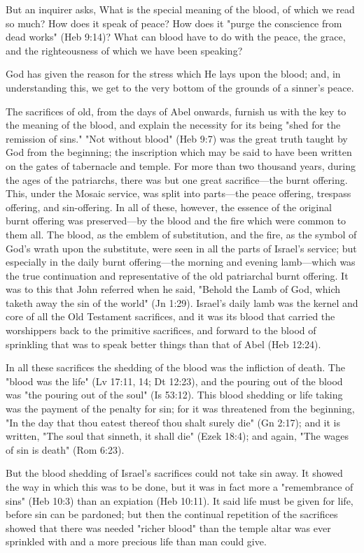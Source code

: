 \documentclass[
]{book}
\begin{document}
But an inquirer asks, What is the special meaning of the blood, of which we read so much? How does it speak of peace? How does it "purge the conscience from dead works" (Heb 9:14)? What can blood have to do with the peace, the grace, and the righteousness of which we have been speaking?

God has given the reason for the stress which He lays upon the blood; and, in understanding this, we get to the very bottom of the grounds of a sinner's peace.

The sacrifices of old, from the days of Abel onwards, furnish us with the key to the meaning of the blood, and explain the necessity for its being "shed for the remission of sins." "Not without blood" (Heb 9:7) was the great truth taught by God from the beginning; the inscription which may be said to have been written on the gates of tabernacle and temple. For more than two thousand years, during the ages of the patriarchs, there was but one great sacrifice---the burnt offering. This, under the Mosaic service, was split into parts---the peace offering, trespass offering, and sin-offering. In all of these, however, the essence of the original burnt offering was preserved---by the blood and the fire which were common to them all. The blood, as the emblem of substitution, and the fire, as the symbol of God's wrath upon the substitute, were seen in all the parts of Israel's service; but especially in the daily burnt offering---the morning and evening lamb---which was the true continuation and representative of the old patriarchal burnt offering. It was to this that John referred when he said, "Behold the Lamb of God, which taketh away the sin of the world" (Jn 1:29). Israel's daily lamb was the kernel and core of all the Old Testament sacrifices, and it was its blood that carried the worshippers back to the primitive sacrifices, and forward to the blood of sprinkling that was to speak better things than that of Abel (Heb 12:24).

In all these sacrifices the shedding of the blood was the infliction of death. The "blood was the life" (Lv 17:11, 14; Dt 12:23), and the pouring out of the blood was "the pouring out of the soul" (Is 53:12). This blood shedding or life taking was the payment of the penalty for sin; for it was threatened from the beginning, "In the day that thou eatest thereof thou shalt surely die" (Gn 2:17); and it is written, "The soul that sinneth, it shall die" (Ezek 18:4); and again, "The wages of sin is death" (Rom 6:23).

But the blood shedding of Israel's sacrifices could not take sin away. It showed the way in which this was to be done, but it was in fact more a "remembrance of sins" (Heb 10:3) than an expiation (Heb 10:11). It said life must be given for life, before sin can be pardoned; but then the continual repetition of the sacrifices showed that there was needed "richer blood" than the temple altar was ever sprinkled with and a more precious life than man could give.
\end{document}
